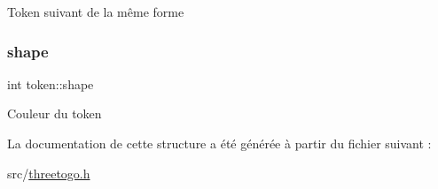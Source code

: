 Token suivant de la même forme \mbox{\label{structtoken_a314611343d3c7ae65b11356fd5618ea1}} 
\subsubsection{\texorpdfstring{shape}{shape}}
{\footnotesize\ttfamily int token\+::shape}

Couleur du token 

La documentation de cette structure a été générée à partir du fichier suivant \+:\begin{DoxyCompactItemize}
\item 
src/\hyperlink{threetogo_8h}{threetogo.\+h}\end{DoxyCompactItemize}
